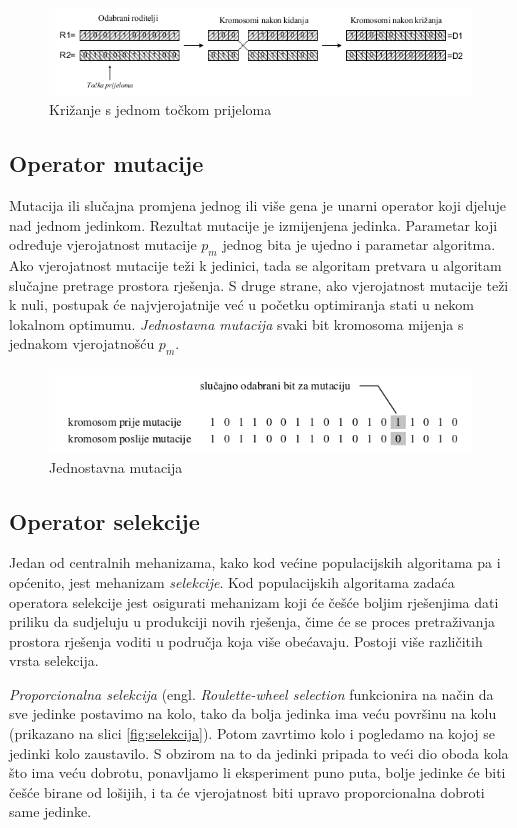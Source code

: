 \documentclass[times, utf8, zavrsni, numeric]{fer}
\begin{document}
\begin{figure}[htb]
\centering
\includegraphics[width=12cm]{img/krizanje.png}
\caption{Križanje s jednom točkom prijeloma}
\label{fig:krizanje}
\end{figure}

\subsection{Operator mutacije}
Mutacija ili slučajna promjena jednog ili više gena je unarni operator koji djeluje nad jednom jedinkom. Rezultat mutacije je izmijenjena jedinka. Parametar koji određuje vjerojatnost mutacije $p_m$ jednog bita je ujedno i parametar algoritma. Ako vjerojatnost mutacije teži k jedinici, tada se algoritam pretvara u algoritam slučajne pretrage prostora rješenja. S druge strane, ako vjerojatnost mutacije teži k nuli, postupak će najvjerojatnije već u početku optimiranja stati u nekom lokalnom optimumu. \emph{Jednostavna mutacija} svaki bit kromosoma mijenja s jednakom vjerojatnošću $p_m$.

\begin{figure}[htb]
\centering
\includegraphics[width=12cm]{img/mutacija.png}
\caption{Jednostavna mutacija}
\label{fig:mutacija}
\end{figure}

\subsection{Operator selekcije}
Jedan od centralnih mehanizama, kako kod većine populacijskih algoritama pa i općenito, jest mehanizam \emph{selekcije}. Kod populacijskih algoritama zadaća operatora selekcije jest osigurati mehanizam koji će češće boljim rješenjima dati priliku da sudjeluju u produkciji novih rješenja, čime će se proces pretraživanja prostora rješenja voditi u područja koja više obećavaju. Postoji više različitih vrsta selekcija.

\emph{Proporcionalna selekcija} (engl. \emph{Roulette-wheel selection} funkcionira na način da sve jedinke postavimo na kolo, tako da bolja jedinka ima veću površinu na kolu (prikazano na slici \ref{fig:selekcija}). Potom zavrtimo kolo i pogledamo na kojoj se jedinki kolo zaustavilo. S obzirom na to da jedinki pripada to veći dio oboda kola što ima veću dobrotu, ponavljamo li eksperiment puno puta, bolje jedinke će biti češće birane od lošijih, i ta će vjerojatnost biti upravo proporcionalna dobroti same jedinke.
\end{document}
